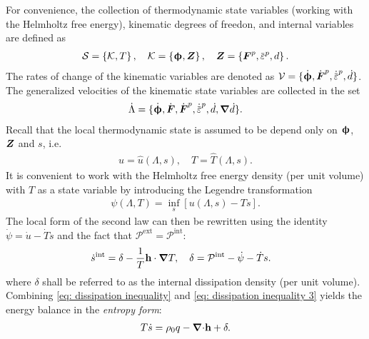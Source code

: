 For convenience, the collection of thermodynamic state variables (working with the Helmholtz free energy), kinematic degrees of freedon, and internal variables are defined as
\begin{align}
  \mathcal{S} = \left\{ \mathcal{K}, T \right\}, \quad \mathcal{K} = \left\{ \bs{\upphi}, \bfZ \right\}, \quad \bfZ = \left\{ \bfF^p, \ep, d \right\}.
\end{align}
The rates of change of the kinematic variables are denoted as $\mathcal{V} = \{ \defrate, \dot{\defgrad}^p, \epdot, \dot{d} \}$. The generalized velocities of the kinematic state variables are collected in the set
\begin{align}
  \dot{\Lambda} = \{ \defrate, \dot{\defgrad}, \dot{\defgrad}^p, \epdot, \dot{d}, \grad \dot{d} \}.
\end{align}
Recall that the local thermodynamic state is assumed to be depend only on $\boldsymbol{\upphi}$, $\boldsymbol{Z}$ and $s$, i.e.
\begin{align}
  u = \hat{u}(\Lambda, s), \quad T = \hat{T}(\Lambda, s).
\end{align}
It is convenient to work with the Helmholtz free energy density (per unit volume) with $T$ as a state variable by introducing the Legendre transformation
\begin{align}
  \psi(\Lambda, T) = \inf_s \left[ u(\Lambda, s) - Ts \right].
\end{align}
The local form of the second law can then be rewritten using the identity $\dot{\psi} = \dot{u} - \dot{T}s$ and the fact that $\mathcal{P}^\text{ext} = \mathcal{P}^\text{int}$:
\begin{align}
  \dot{s}^\text{int} & = \delta - \dfrac{1}{T} \textbf{h} \cdot \boldsymbol{\nabla} T,  \quad \delta = \mathcal{P}^\text{int} - \dot{\psi} - \dot{T}s. \label{eq: dissipation inequality 3} 
\end{align}
where $\delta$ shall be referred to as the internal dissipation density (per unit volume). Combining \eqref{eq: dissipation inequality} and \eqref{eq: dissipation inequality 3} yields the energy balance in the \emph{entropy form}:
\begin{align}
  T\dot{s} = \rho_0 q - {\boldsymbol{\nabla} \cdot} \textbf{h} + \delta. \label{eq: energy balance entropy form}
\end{align}

